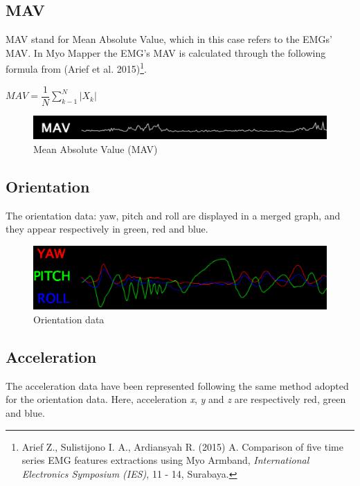 \documentclass[12pt,a4paper]{article}
\begin{document}
		\subsection{MAV}

		MAV stand for Mean Absolute Value, which in this case refers to the EMGs' MAV. In Myo Mapper the EMG's MAV is calculated through the following formula from (Arief et al. 2015)\footnote{Arief Z., Sulistijono I. A., Ardiansyah R. (2015) A. Comparison of five time series EMG features extractions using Myo Armband, \textit{International Electronics Symposium (IES)}, 11 - 14, Surabaya.}.
		
		\begin{math}
		     MAV = \dfrac{1}{N} \displaystyle\sum_{k-1}^{N} \lvert X_{k} \rvert
		\end{math}
		
				\begin{figure}[h]
					\centering
					\includegraphics[width=0.6\linewidth]{../images/MyoMapper-MAV}
					\caption{Mean Absolute Value (MAV)}
					\label{fig:MyoMapper-MAV}
				\end{figure}
	
		\subsection{Orientation}
		The orientation data: yaw, pitch and roll are displayed in a merged graph, and they appear respectively in green, red and blue.
		
		\begin{figure}[h]
			\centering
			\includegraphics[width=0.6\linewidth]{../images/MyoMapper-YPR}
			\caption{Orientation data}
			\label{fig:MyoMapper-Orientation}
		\end{figure}
	
		\subsection{Acceleration}
		The acceleration data have been represented following the same method adopted for the orientation data. Here, acceleration \textit{x}, \textit{y} and \textit{z} are respectively red, green and blue.
	
\end{document}
